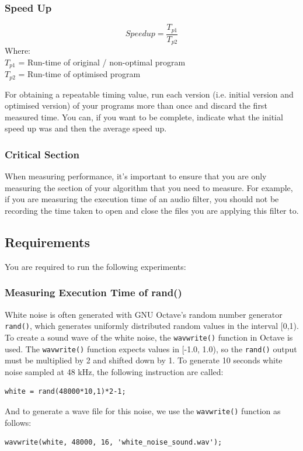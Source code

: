 \subsubsection{Speed Up}
\begin{equation}
Speedup = \frac{T_{p1}}{T_{p2}}
\end{equation}
Where:\\
$T_{p1}$ = Run-time of original / non-optimal program\\
$T_{p2}$ = Run-time of optimised program

For obtaining a repeatable timing value, run each version (i.e. initial version and optimised version) of your programs more than once and discard the first measured time. You can, if you want to be complete, indicate what the initial speed up was and then the average speed up.

\subsubsection{Critical Section}
When measuring performance, it's important to ensure that you are only measuring the section of your algorithm that you need to measure. For example, if you are measuring the execution time of an audio filter, you should not be recording the time taken to open and close the files you are applying this filter to.

\subsection{Requirements}
You are required to run the following experiments:
\subsubsection{Measuring Execution Time of rand()}
White noise is often generated with GNU Octave’s random number generator \verb|rand()|, which generates uniformly distributed random values in the interval [0,1). To create a sound wave of the white noise, the \verb|wavwrite()| function in Octave is used. The \verb|wavwrite()| function expects values in [-1.0, 1.0), so the \verb|rand()| output must be multiplied by 2 and shifted down by 1. To generate 10 seconds white noise sampled at 48 kHz, the following instruction are called:
\begin{lstlisting}
white = rand(48000*10,1)*2-1;
\end{lstlisting}
And to generate a wave file for this noise, we use the \verb|wavwrite()| function as follows:
\begin{lstlisting}
wavwrite(white, 48000, 16, 'white_noise_sound.wav');
\end{lstlisting}

